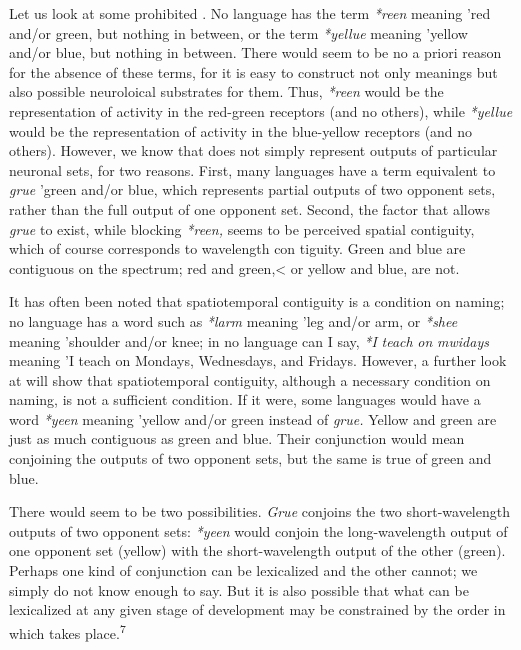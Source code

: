 Let us look at some prohibited . No language has the term \textit{*reen} meaning 'red and/or green, but nothing in between, or the term \textit{*yellue} meaning 'yellow and/or blue, but nothing in between. There would seem to be no a priori reason for the absence of these terms, for it is easy to construct not only meanings but also possible neuroloical substrates for them. Thus, \textit{*reen} would be the represen\-tation of activity in the red-green receptors (and no others), while
\textit{*yellue} would be the representation of activity in the blue-yellow receptors (and no others). However, we know that  does not simply represent outputs of particular neuronal sets, for two reasons. First, many languages have a term equivalent to \textit{grue} 'green and/or blue, which represents partial outputs of two opponent sets, rather than the full output of one opponent set. Second, the factor that allows \textit{grue} to exist, while blocking \textit{*reen,} seems to be perceived spatial contiguity, which of course corresponds to wavelength con tiguity. Green and blue are contiguous on the spectrum; red and green,{\textless} or yellow and blue, are not.


It has often been noted that spatiotemporal contiguity is a condition on naming; no language has a word such as \textit{*larm} meaning 'leg and/or arm, or \textit{*shee} meaning 'shoulder and/or knee; in no lan\-guage can I say, \textit{*I} \textit{teach} \textit{on} \textit{mwidays} meaning 'I teach on Mondays, Wednesdays, and Fridays. However, a further look at  will show that spatiotemporal contiguity, although a necessary condition on naming, is not a sufficient condition. If it were, some languages would have a word \textit{*yeen} meaning 'yellow and/or green instead of \textit{grue.} Yellow and green are just as much contiguous as green and blue. Their conjunction would mean conjoining the outputs of two oppo\-nent sets, but the same is true of green and blue.

There would seem to be two possibilities. \textit{Grue }conjoins the two short-wavelength outputs of two opponent sets: \textit{*yeen} would conjoin the long-wavelength output of one opponent set (yellow) with the short-wavelength output of the other (green). Perhaps one kind of conjunction can be lexicalized and the other cannot; we simply do not know enough to say. But it is also possible that what can be lexicalized at any given stage of development may be constrained by the order in which  takes place.\textsuperscript{7}

